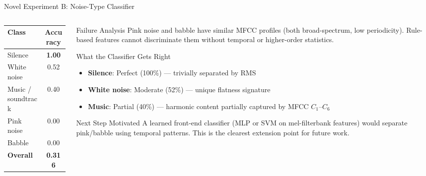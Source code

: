 \documentclass[aspectratio=169]{beamer}
\begin{document}
\begin{frame}{Novel Experiment B: Noise-Type Classifier}
\begin{columns}[T]
\begin{column}{0.52\textwidth}
      \begin{center}
        \begin{tabular}{@{}lc@{}}
          \toprule
          \textbf{Class} & \textbf{Accuracy} \\
          \midrule
          Silence & \textbf{1.00} \\
          White noise & 0.52 \\
          Music / soundtrack & 0.40 \\
          Pink noise & 0.00 \\
          Babble & 0.00 \\
          \midrule
          \textbf{Overall} & \textbf{0.316} \\
          \bottomrule
        \end{tabular}
      \end{center}
    \end{column}
    \begin{column}{0.45\textwidth}
      \begin{alertblock}{Failure Analysis}
        Pink noise and babble have similar MFCC profiles (both broad-spectrum, low periodicity). Rule-based features cannot discriminate them without temporal or higher-order statistics.
      \end{alertblock}
      \begin{block}{What the Classifier Gets Right}
        \begin{itemize}
          \item \textbf{Silence}: Perfect (100\%) — trivially separated by RMS
          \item \textbf{White noise}: Moderate (52\%) — unique flatness signature
          \item \textbf{Music}: Partial (40\%) — harmonic content partially captured by MFCC $C_1$--$C_6$
        \end{itemize}
      \end{block}
      \begin{block}{Next Step Motivated}
        A learned front-end classifier (MLP or SVM on mel-filterbank features) would separate pink/babble using temporal patterns. This is the clearest extension point for future work.
      \end{block}
    \end{column}
  \end{columns}
\end{frame}
\end{document}
